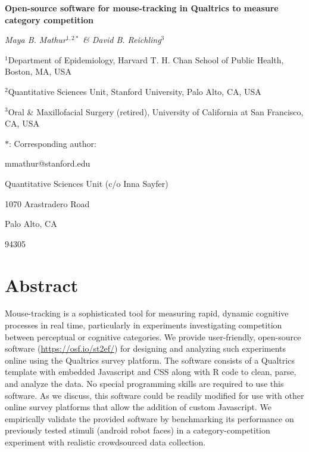 \documentclass[]{article}
\title{}
\author{}
\date{}
\begin{document}
\doublespacing

\begin{center}
\textbf{ \LARGE{Open-source software for mouse-tracking in Qualtrics to measure category competition} }
\vspace{10mm}
\end{center}

\doublespacing

\vspace{10mm}

\begin{center}
\large{ \emph{ Maya B. Mathur$^{1, 2\ast}$ \& David B. Reichling$^{3}$ } }\\
\end{center}

\vspace{20mm}

\small{$^{1}$Department of Epidemiology, Harvard T. H. Chan School of Public Health, Boston, MA, USA}

\small{$^{2}$Quantitative Sciences Unit, Stanford University, Palo Alto, CA, USA}

\small{$^{3}$Oral \& Maxillofacial Surgery (retired), University of California at San Francisco, CA, USA}

\vspace{20mm} \singlespacing
\small{$\ast$: Corresponding author:

mmathur@stanford.edu

Quantitative Sciences Unit (c/o Inna Sayfer)

1070 Arastradero Road

Palo Alto, CA

94305

}

\vspace{20mm}

\setlength{\parskip}{1em}

\newpage

\section*{Abstract}

Mouse-tracking is a sophisticated tool for measuring rapid, dynamic
cognitive processes in real time, particularly in experiments
investigating competition between perceptual or cognitive categories. We
provide user-friendly, open-source software
(\url{https://osf.io/st2ef/}) for designing and analyzing such
experiments online using the Qualtrics survey platform. The software
consists of a Qualtrics template with embedded Javascript and CSS along
with R code to clean, parse, and analyze the data. No special
programming skills are required to use this software. As we discuss,
this software could be readily modified for use with other online survey
platforms that allow the addition of custom Javascript. We empirically
validate the provided software by benchmarking its performance on
previously tested stimuli (android robot faces) in a
category-competition experiment with realistic crowdsourced data
collection.
\end{document}
